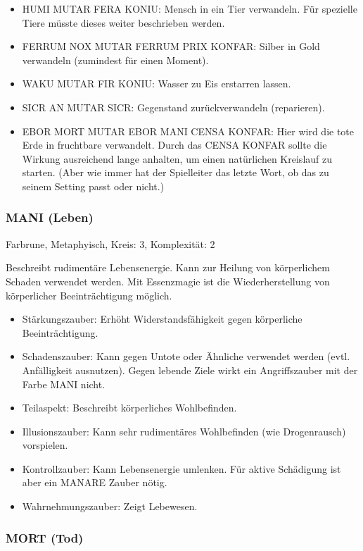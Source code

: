 \documentclass{article}
\begin{document}
\begin{itemize}
\item HUMI MUTAR FERA KONIU: Mensch in ein Tier verwandeln. Für spezielle Tiere müsste dieses weiter beschrieben werden.
\item FERRUM NOX MUTAR FERRUM PRIX KONFAR: Silber in Gold verwandeln (zumindest für einen Moment).
\item WAKU MUTAR FIR KONIU: Wasser zu Eis erstarren lassen.
\item SICR AN MUTAR SICR: Gegenstand zurückverwandeln (reparieren).
\item EBOR MORT MUTAR EBOR MANI CENSA KONFAR: Hier wird die tote Erde in fruchtbare verwandelt. Durch das CENSA KONFAR sollte die Wirkung ausreichend lange anhalten, um einen natürlichen Kreislauf zu starten. (Aber wie immer hat der Spielleiter das letzte Wort, ob das zu seinem Setting passt oder nicht.)
\end{itemize}

\subsubsection{MANI (Leben)}

Farbrune, Metaphyisch, Kreis: 3, Komplexität: 2

Beschreibt rudimentäre Lebensenergie. Kann zur Heilung von körperlichem Schaden verwendet werden. Mit Essenzmagie ist
die Wiederherstellung von körperlicher Beeinträchtigung möglich.

\begin{itemize}
\item Stärkungszauber: Erhöht Widerstandsfähigkeit gegen körperliche Beeinträchtigung.
\item Schadenszauber: Kann gegen Untote oder Ähnliche verwendet werden (evtl. Anfälligkeit ausnutzen). Gegen lebende Ziele wirkt ein Angriffszauber mit der Farbe MANI nicht.
\item Teilaspekt: Beschreibt körperliches Wohlbefinden.
\item Illusionszauber: Kann sehr rudimentäres Wohlbefinden (wie Drogenrausch) vorspielen.
\item Kontrollzauber: Kann Lebensenergie umlenken. Für aktive Schädigung ist aber ein MANARE Zauber nötig.
\item Wahrnehmungszauber: Zeigt Lebewesen.
\end{itemize}

\subsubsection{MORT (Tod)}
\end{document}
